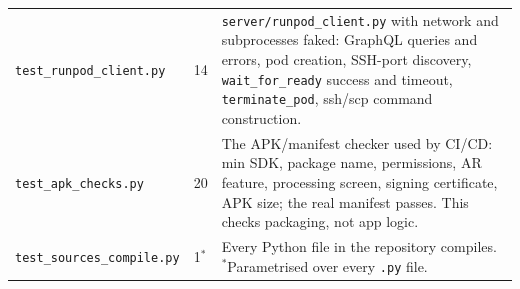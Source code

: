 {\begin{longtable}{p{}p{}p{}}
\texttt{test\_runpod\_client.py} & 14 & \texttt{server/runpod\_client.py} with network and subprocesses faked: GraphQL queries and errors, pod creation, SSH-port discovery, \texttt{wait\_for\_ready} success and timeout, \texttt{terminate\_pod}, ssh/scp command construction. \\
\texttt{test\_apk\_checks.py} & 20 & The APK/manifest checker used by CI/CD: min SDK, package name, permissions, AR feature, processing screen, signing certificate, APK size; the real manifest passes. This checks packaging, not app logic. \\
\texttt{test\_sources\_compile.py} & 1$^{*}$ & Every Python file in the repository compiles. $^{*}$Parametrised over every \texttt{.py} file. \\
\bottomrule
\end{longtable}
}

